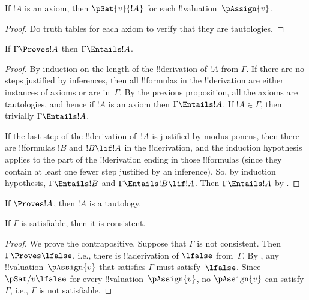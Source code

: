 \begin{prop}
  If $!A$ is an axiom, then
  $\pSat{v}{!A}$ for each !!{valuation}~$\pAssign{v}$.
\end{prop}

\begin{proof}
Do truth
  tables for each axiom to verify that they are tautologies.
\end{proof}

\begin{thm}[Soundness]
If $\Gamma \Proves !A$ then $\Gamma \Entails !A$.
\end{thm}

\begin{proof}
By induction on the length of the !!{derivation} of $!A$ from
$\Gamma$. If there are no steps justified by inferences, then all
!!{formula}s in the !!{derivation} are either instances of axioms or are
in~$\Gamma$. By the previous proposition, all the axioms are
tautologies, and hence if $!A$ is an axiom then
$\Gamma \Entails !A$. If $!A \in \Gamma$, then trivially $\Gamma
\Entails !A$.

If the last step of the !!{derivation} of~$!A$ is justified by modus
ponens, then there are !!{formula}s $!B$ and $!B \lif !A$ in the
!!{derivation}, and the induction hypothesis applies to the part of
the !!{derivation} ending in those !!{formula}s (since they contain at
least one fewer step justified by an inference).  So, by induction
hypothesis, $\Gamma \Entails !B$ and $\Gamma \Entails !B \lif
!A$. Then $\Gamma \Entails !A$ by
.


\end{proof}



\begin{cor}
If $\Proves !A$, then $!A$ is a tautology.
\end{cor}

\begin{cor}
If $\Gamma$ is satisfiable, then it is consistent.
\end{cor}

\begin{proof}
We prove the contrapositive.  Suppose that $\Gamma$ is not consistent.
Then $\Gamma \Proves \lfalse$, i.e., there is !!a{derivation} of
$\lfalse$ from~$\Gamma$. By , any
!!{valuation}~$\pAssign{v}$
that satisfies $\Gamma$ must satisfy~$\lfalse$.  Since
$\pSat/{v}{\lfalse}$ for every
  !!{valuation}~$\pAssign{v}$, no
$\pAssign{v}$ can satisfy $\Gamma$, i.e.,
$\Gamma$ is not satisfiable.
\end{proof}






\OLEndChapterHook







